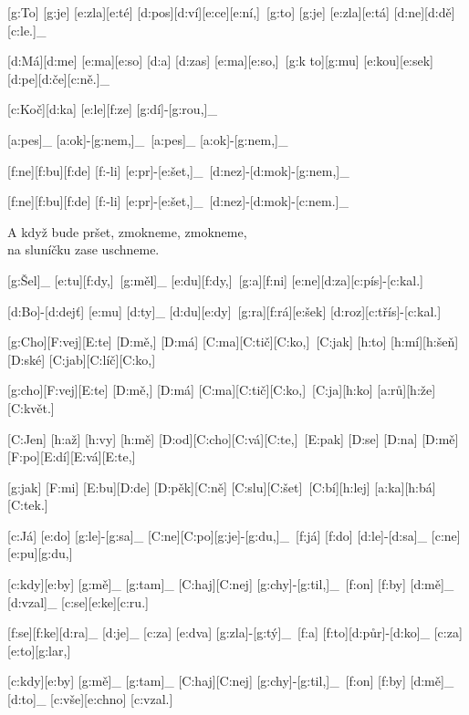 
[g:To] [g:je] [e:zla][e:té] [d:pos][d:ví][e:ce][e:ní,]\
[g:to] [g:je] [e:zla][e:tá] [d:ne][d:dě][c:le.]_\

[d:Má][d:me] [e:ma][e:so] [d:a] [d:zas] [e:ma][e:so,]\
[g:k to][g:mu] [e:kou][e:sek] [d:pe][d:če][c:ně.]_\



[c:Koč][d:ka] [e:le][f:ze] [g:dí]-[g:rou,]_\

[a:pes]_ [a:ok]-[g:nem,]_\
[a:pes]_ [a:ok]-[g:nem,]_\

[f:ne][f:bu][f:de] [f:-li] [e:pr]-[e:šet,]_\
[d:nez]-[d:mok]-[g:nem,]_\

[f:ne][f:bu][f:de] [f:-li] [e:pr]-[e:šet,]_\
[d:nez]-[d:mok]-[c:nem.]_\

A když bude pršet, zmokneme, zmokneme,\\
na sluníčku zase uschneme.



[g:Šel]_ [e:tu][f:dy,]\
[g:měl]_ [e:du][f:dy,]\
[g:a][f:ni] [e:ne][d:za][c:pís]-[c:kal.]\

[d:Bo]-[d:dejť] [e:mu] [d:ty]_ [d:du][e:dy]\
[g:ra][f:rá][e:šek] [d:roz][c:třís]-[c:kal.]\



[g:Cho][F:vej][E:te] [D:mě,] [D:má] [C:ma][C:tič][C:ko,]\
[C:jak] [h:to] [h:mí][h:šeň][D:ské] [C:jab][C:líč][C:ko,]\

[g:cho][F:vej][E:te] [D:mě,] [D:má] [C:ma][C:tič][C:ko,]\
[C:ja][h:ko] [a:rů][h:že] [C:květ.]\

[C:Jen] [h:až] [h:vy] [h:mě] [D:od][C:cho][C:vá][C:te,]\
[E:pak] [D:se] [D:na] [D:mě] [F:po][E:dí][E:vá][E:te,]\

[g:jak] [F:mi] [E:bu][D:de] [D:pěk][C:ně] [C:slu][C:šet]\
[C:bí][h:lej] [a:ka][h:bá][C:tek.]\


\pis{Já do lesa nepojedu}{c}{C}

{\minw=4.5mm

[c:Já] [e:do] [g:le]-[g:sa]_ [C:ne][C:po][g:je]-[g:du,]_\
[f:já] [f:do] [d:le]-[d:sa]_ [c:ne][e:pu][g:du,]\

[c:kdy][e:by] [g:mě]_ [g:tam]_ [C:haj][C:nej] [g:chy]-[g:til,]_\
[f:on] [f:by] [d:mě]_ [d:vzal]_ [c:se][e:ke][c:ru.]\

[f:se][f:ke][d:ra]_ [d:je]_ [c:za] [e:dva] [g:zla]-[g:tý]_\
[f:a] [f:to][d:půr]-[d:ko]_ [c:za] [e:to][g:lar,]\

[c:kdy][e:by] [g:mě]_ [g:tam]_ [C:haj][C:nej] [g:chy]-[g:til,]_\
[f:on] [f:by] [d:mě]_ [d:to]_ [c:vše][e:chno] [c:vzal.]\
}


